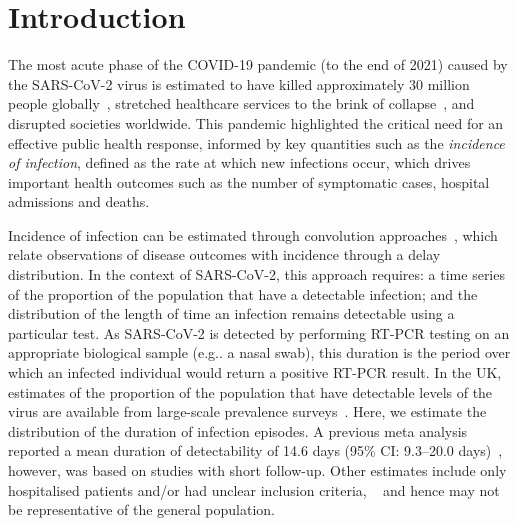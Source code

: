 \documentclass[12pt]{article}
\makeatletter
\DeclareRobustCommand\onedot{\futurelet\@let@token\@onedot}
\def\@onedot{\ifx\@let@token.\else.\null\fi\xspace}
\def\eg{e.g\onedot} \def\Eg{{E.g}\onedot}
\makeatother
\begin{document}

\newpage
{} %
\section{Introduction} \label{sec:intro}

The most acute phase of the COVID-19 pandemic (to the end of 2021) caused by the SARS-CoV-2 virus is estimated to have killed approximately 30 million people globally~\citep{whoCOVIDExcess}, stretched healthcare services to the brink of collapse~\citep{fongNHS}, and disrupted societies worldwide.
This pandemic highlighted the critical need for an effective public health response, informed by key quantities such as the \emph{incidence of infection}, defined as the rate at which new infections occur, which drives important health outcomes such as the number of symptomatic cases, hospital admissions and deaths. 

Incidence of infection can be estimated through convolution approaches~\citep[e.g.][]{brookmeyerBackcalculation},  which relate observations of disease outcomes with incidence through a delay distribution.
In the context of SARS-CoV-2, this approach requires: a time series of the proportion of the population that have a detectable infection; and the distribution of the length of time an infection remains detectable using a particular test.
As SARS-CoV-2 is detected by performing RT-PCR testing on an appropriate biological sample (\eg a nasal swab), this duration is the period over which an infected individual would return a positive RT-PCR result.
In the UK, estimates of the proportion of the population that have detectable levels of the virus are available from large-scale prevalence surveys~\citep{cisMethodsONS,rileyREACT}.
Here, we estimate the distribution of the duration of infection episodes.
A previous meta analysis reported a mean duration of detectability of 14.6 days (95\% CI: 9.3--20.0 days)~\citep{cevikShedding}, however, was based on studies with short follow-up.
Other estimates include only hospitalised patients and/or had unclear inclusion criteria, ~\citep{ealesCharacterising,hellewellPCRSensitivity} and hence may not be representative of the general population.
\end{document}
